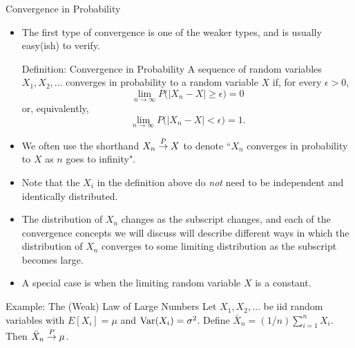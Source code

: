 \begin{frame}[allowframebreaks]{Convergence in Probability}
  
  \begin{itemize}
    \item The first type of convergence is one of the weaker types, and is usually easy(ish) to verify.

  \begin{block}{Definition: Convergence in Probability}
    A sequence of random variables $X_1, X_2, \ldots$ \alert{converges in probability} to a random variable $X$ if, for every $\epsilon > 0$,
    $$
    \lim_{n \rightarrow \infty} P\big(|X_n - X| \geq \epsilon \big) = 0
    $$
    or, equivalently,
    $$
    \lim_{n \rightarrow \infty} P\big(|X_n - X| < \epsilon\big)= 1.
    $$
  \end{block}
    
    \item We often use the shorthand $X_n \overset{P}{\rightarrow} X$ to denote ``$X_n$ converges in probability to $X$ as $n$ goes to infinity". 
    \item Note that the $X_i$ in the definition above do \emph{not} need to be independent and identically distributed.
    \item The distribution of $X_n$ changes as the subscript changes, and each of the convergence concepts we will discuss will describe different ways in which the distribution of $X_n$ converges to some limiting distribution as the subscript becomes large.
    \item A special case is when the limiting random variable $X$ is a constant.
  \end{itemize}
  
  \begin{block}{Example: The (Weak) Law of Large Numbers}
    Let $X_1, X_2, \ldots$ be iid random variables with $E[X_i] = \mu$ and $\mathrm{Var}(X_i) = \sigma^2$.
    Define $\bar{X}_n = (1/n)\sum^{n}_{i = 1} X_i$. Then $\bar{X}_n \overset{P}{\rightarrow} \mu$.
    
\end{block}
\end{frame}
